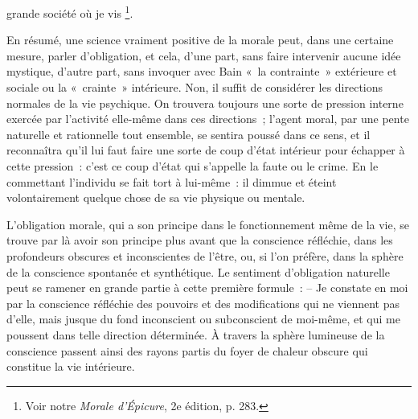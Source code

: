 \documentclass[french,twoside]{book} %
\begin{document}
grande société où je vis \footnote{Voir notre \emph{Morale d’Épicure}, 2e édition, p. 283.}.\par
En résumé, une science vraiment positive de la morale peut, dans une certaine mesure, parler d’obligation, et cela, d’une part, sans faire intervenir aucune idée mystique, d’autre part, sans invoquer avec Bain « la contrainte » extérieure et sociale ou la « crainte » intérieure. Non, il suffit de considérer les directions normales de la vie psychique. On trouvera toujours une sorte de pression interne exercée par l’activité elle-même dans ces directions ; l’agent moral, par une pente naturelle et rationnelle tout ensemble, se sentira poussé dans ce sens, et il reconnaîtra qu’il lui faut faire une sorte de coup d’état intérieur pour échapper à cette pression : c’est ce coup d’état qui s’appelle la faute ou le crime. En le commettant l’individu se fait tort à lui-même : il dimmue et éteint volontairement quelque chose de sa vie physique ou mentale.\par
L’obligation morale, qui a son principe dans le fonctionnement même de la vie, se trouve par là avoir son principe plus avant que la conscience réfléchie, dans les profondeurs obscures et inconscientes de l’être, ou, si l’on préfère, dans la sphère de la conscience spontanée et synthétique. Le sentiment d’obligation naturelle peut se ramener en grande partie à cette première formule : – Je constate en moi par la conscience réfléchie des pouvoirs et des modifications qui ne viennent pas d’elle, mais jusque du fond inconscient ou subconscient de moi-même, et qui me poussent dans telle direction déterminée. À travers la sphère lumineuse de la conscience passent ainsi des rayons partis du foyer de chaleur obscure qui constitue la vie intérieure.
\end{document}
